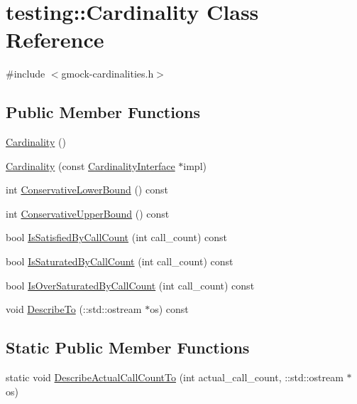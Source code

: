 \hypertarget{classtesting_1_1_cardinality}{}\section{testing\+:\+:Cardinality Class Reference}
\label{classtesting_1_1_cardinality}


{\ttfamily \#include $<$gmock-\/cardinalities.\+h$>$}

\subsection*{Public Member Functions}
\begin{DoxyCompactItemize}
\item 
\hyperlink{classtesting_1_1_cardinality_ab4b4066d7f5e9e3c7f851e49ab892cd9}{Cardinality} ()
\item 
\hyperlink{classtesting_1_1_cardinality_a10aed768b8a22d27110587444733771f}{Cardinality} (const \hyperlink{classtesting_1_1_cardinality_interface}{Cardinality\+Interface} $\ast$impl)
\item 
int \hyperlink{classtesting_1_1_cardinality_ac1785ee5c466c2524f36b9ffb5f46c79}{Conservative\+Lower\+Bound} () const
\item 
int \hyperlink{classtesting_1_1_cardinality_acb42e3683f99b986f3ac538b5eefbc31}{Conservative\+Upper\+Bound} () const
\item 
bool \hyperlink{classtesting_1_1_cardinality_a6c5e2bd2887ff06e20e6fcc4255a0c1c}{Is\+Satisfied\+By\+Call\+Count} (int call\+\_\+count) const
\item 
bool \hyperlink{classtesting_1_1_cardinality_a57128ba46931e24a2b39af177e3346f8}{Is\+Saturated\+By\+Call\+Count} (int call\+\_\+count) const
\item 
bool \hyperlink{classtesting_1_1_cardinality_a9b6a55179f6dcc8fadec26e6d93f3e88}{Is\+Over\+Saturated\+By\+Call\+Count} (int call\+\_\+count) const
\item 
void \hyperlink{classtesting_1_1_cardinality_a2955f4b65022c422f56e79b767c4fa71}{Describe\+To} (\+::std\+::ostream $\ast$os) const
\end{DoxyCompactItemize}
\subsection*{Static Public Member Functions}
\begin{DoxyCompactItemize}
\item 
static void \hyperlink{classtesting_1_1_cardinality_a7cbea339e2f3072a98367e087aa296e8}{Describe\+Actual\+Call\+Count\+To} (int actual\+\_\+call\+\_\+count, \+::std\+::ostream $\ast$os)
\end{DoxyCompactItemize}


